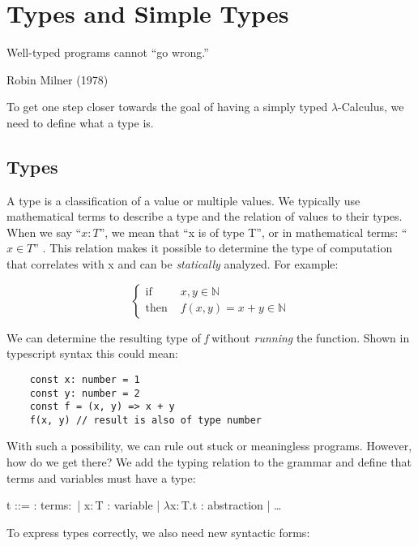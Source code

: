 \section{Types and Simple Types}

\epigraph{Well-typed programs cannot ``go wrong.''}{Robin Milner (1978)}

To get one step closer towards the goal of having a
simply typed $\lambda$-Calculus, we need to define
what a type is.

\subsection{Types}

A type is a classification of a value or multiple values.
We typically use mathematical terms to describe a type and the relation
of values to their types. When we say ``$x : T$'', we mean that
``x is of type T'', or in mathematical terms: ``$x \in T$'' \cite{pierce2002ProgLang}.
This relation makes it possible to determine the type of computation
that correlates with x and can be \textit{statically} analyzed.
For example:

\begin{equation*}
    \begin{cases}
        \text{if }   & x,y \in \mathbb{N}            \\
        \text{then } & f(x,y) = x + y \in \mathbb{N}
    \end{cases}
\end{equation*}

We can determine the resulting type of \textit{f} without
\textit{running} the function. Shown in typescript syntax this could mean:

\begin{verbatim}
    const x: number = 1
    const y: number = 2
    const f = (x, y) => x + y
    f(x, y) // result is also of type number
\end{verbatim}

With such a possibility, we can rule out stuck or meaningless programs.
However, how do we get there? We add the typing relation to
the grammar and define that terms and variables must have a type:

\begin{bnfgrammar}
    t ::= : terms$\colon$
    | x$\colon$T : variable
    | $\lambda$x$\colon$T.t : abstraction
    | \dots
\end{bnfgrammar}

To express types correctly, we also need new syntactic forms:


